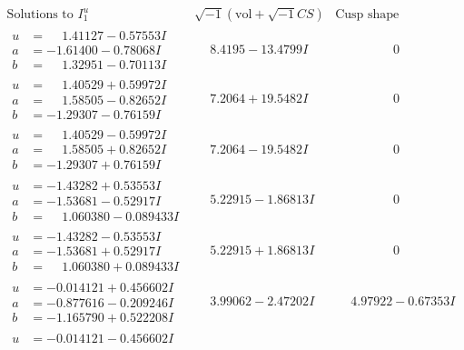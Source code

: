 \documentclass[1p]{elsarticle_modified}
\theoremstyle{definition}
\newcommand{\I}{\sqrt{-1}}
\begin{document}
$$\begin{array}{c|c|c}
\text{Solutions to }I^u_{1}& \I (\text{vol} + \sqrt{-1}CS) & \text{Cusp shape}\\
 \hline 
\begin{aligned}
u &= \phantom{-}1.41127 - 0.57553 I \\
a &= -1.61400 - 0.78068 I \\
b &= \phantom{-}1.32951 - 0.70113 I\end{aligned}
 & \phantom{-}8.4195 - 13.4799 I & \phantom{-0.000000 } 0 \\ \hline\begin{aligned}
u &= \phantom{-}1.40529 + 0.59972 I \\
a &= \phantom{-}1.58505 - 0.82652 I \\
b &= -1.29307 - 0.76159 I\end{aligned}
 & \phantom{-}7.2064 + 19.5482 I & \phantom{-0.000000 } 0 \\ \hline\begin{aligned}
u &= \phantom{-}1.40529 - 0.59972 I \\
a &= \phantom{-}1.58505 + 0.82652 I \\
b &= -1.29307 + 0.76159 I\end{aligned}
 & \phantom{-}7.2064 - 19.5482 I & \phantom{-0.000000 } 0 \\ \hline\begin{aligned}
u &= -1.43282 + 0.53553 I \\
a &= -1.53681 - 0.52917 I \\
b &= \phantom{-}1.060380 - 0.089433 I\end{aligned}
 & \phantom{-}5.22915 - 1.86813 I & \phantom{-0.000000 } 0 \\ \hline\begin{aligned}
u &= -1.43282 - 0.53553 I \\
a &= -1.53681 + 0.52917 I \\
b &= \phantom{-}1.060380 + 0.089433 I\end{aligned}
 & \phantom{-}5.22915 + 1.86813 I & \phantom{-0.000000 } 0 \\ \hline\begin{aligned}
u &= -0.014121 + 0.456602 I \\
a &= -0.877616 - 0.209246 I \\
b &= -1.165790 + 0.522208 I\end{aligned}
 & \phantom{-}3.99062 - 2.47202 I & \phantom{-}4.97922 - 0.67353 I \\ \hline\begin{aligned}
u &= -0.014121 - 0.456602 I \\

\end{aligned}
\end{array}$$
\end{document}
